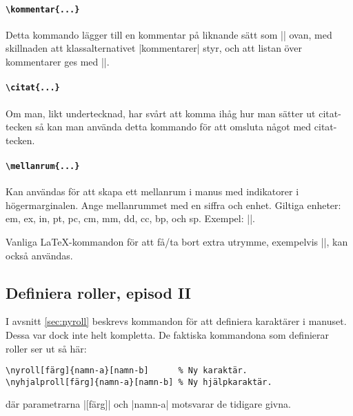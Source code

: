 \documentclass[a4paper,12pt]{article}
\begin{document}
\paragraph{\tt\bfseries\textbackslash kommentar\{...\}}
Detta kommando lägger till en kommentar på liknande sätt som |\TODO| ovan, med skillnaden att klassalternativet |kommentarer| styr, och att listan över kommentarer ges med |\kommentarlista|.

\paragraph{\tt\bfseries\textbackslash citat\{...\}}
Om man, likt undertecknad, har svårt att komma ihåg hur man sätter ut citat-tecken så kan man använda detta kommando för att omsluta något med citat-tecken. 

\paragraph{\tt\bfseries\textbackslash mellanrum\{...\}}
Kan användas för att skapa ett mellanrum i manus med indikatorer i högermarginalen. Ange mellanrummet med en siffra och enhet. Giltiga enheter: em, ex, in, pt, pc, cm, mm, dd, cc, bp, och sp. Exempel: |\mellanrum{3em}|.

Vanliga \LaTeX-kommandon för att få/ta bort extra utrymme, exempelvis |\vspace{3em}|, kan också användas.



\subsection{Definiera roller, episod II}
\label{sec:nyrollII}
I avsnitt \ref{sec:nyroll} beskrevs kommandon för att definiera karaktärer i manuset. Dessa var dock inte helt kompletta. 
De faktiska kommandona som definierar roller ser ut så här:

\begin{lstlisting}
\nyroll[färg]{namn-a}[namn-b]      % Ny karaktär.
\nyhjalproll[färg]{namn-a}[namn-b] % Ny hjälpkaraktär.
\end{lstlisting}

\noindent
där parametrarna |[färg]| och |{namn-a}| motsvarar de tidigare givna. 
\end{document}
